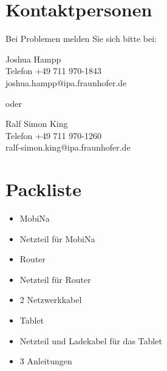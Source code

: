 \documentclass[11pt]{article} %
\newcommand{\mb}{MobiNa}
\begin{document}
\clearpage
\newpage
\section{Kontaktpersonen}

Bei Problemen melden Sie sich bitte bei:

\begin{framed}
{\parindent0pt
Joshua Hampp \\
Telefon +49 711 970-1843 \\
joshua.hampp@ipa.fraunhofer.de
}\end{framed}

oder

\begin{framed}
{\parindent0pt
Ralf Simon King \\
Telefon +49 711 970-1260 \\
ralf-simon.king@ipa.fraunhofer.de
}\end{framed}


\newpage
\section{Packliste}
\begin{itemize}
	\item \mb{}
	\item Netzteil für \mb{}
	\item Router
	\item Netzteil für Router
	\item 2 Netzwerkkabel
	\item Tablet
	\item Netzteil und Ladekabel für das Tablet
	\item 3 Anleitungen
\end{itemize}
\end{document}
